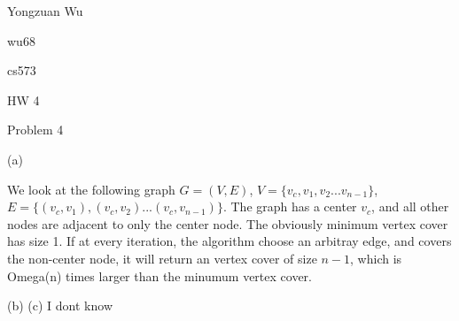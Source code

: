 \documentclass[a4paper,12pt]{article}
\begin{document}
Yongzuan Wu

wu68

cs573

HW 4

Problem 4

(a)

We look at the following graph $G=(V,E)$, $V=\{v_{c},v_{1},v_{2}...v_{n-1}\}$, $E=\{(v_{c},v_{1}),(v_{c},v_{2})...(v_{c},v_{n-1})\}$. The graph has a center $v_{c}$, and all other nodes are adjacent to only the center node. The obviously minimum vertex cover has size 1. If at every iteration, the algorithm choose an arbitray edge, and covers the non-center node, it will return an vertex cover of size $n-1$, which is Omega(n) times larger than the minumum vertex cover.

(b) (c)
I dont know 
\end{document}
